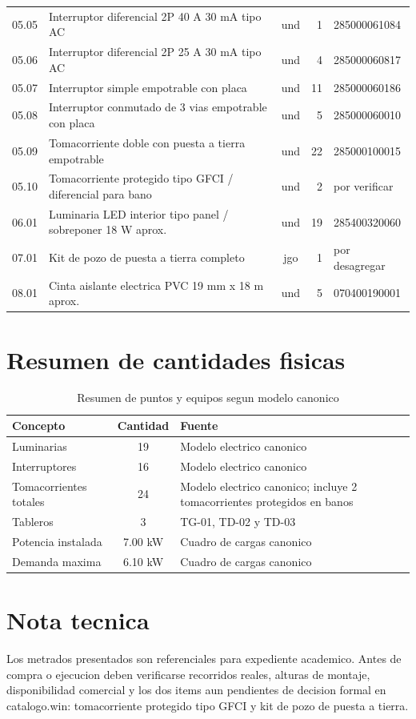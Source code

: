 \begin{landscape}
\begin{longtable}{c L{6.8cm} c r L{3.0cm}}
05.05 & Interruptor diferencial 2P 40 A 30 mA tipo AC & und & 1 & 285000061084 \\
05.06 & Interruptor diferencial 2P 25 A 30 mA tipo AC & und & 4 & 285000060817 \\
05.07 & Interruptor simple empotrable con placa & und & 11 & 285000060186 \\
05.08 & Interruptor conmutado de 3 vias empotrable con placa & und & 5 & 285000060010 \\
05.09 & Tomacorriente doble con puesta a tierra empotrable & und & 22 & 285000100015 \\
05.10 & Tomacorriente protegido tipo GFCI / diferencial para bano & und & 2 & por verificar \\
06.01 & Luminaria LED interior tipo panel / sobreponer 18 W aprox. & und & 19 & 285400320060 \\
07.01 & Kit de pozo de puesta a tierra completo & jgo & 1 & por desagregar \\
08.01 & Cinta aislante electrica PVC 19 mm x 18 m aprox. & und & 5 & 070400190001 \\
\bottomrule
\end{longtable}
\end{landscape}

\section{Resumen de cantidades fisicas}

\begin{table}[H]
\centering
\small
\caption{Resumen de puntos y equipos segun modelo canonico}
\label{tab:resumen-puntos-metrado}
\begin{tabularx}{\textwidth}{L{5.0cm} c Y}
\toprule
\textbf{Concepto} & \textbf{Cantidad} & \textbf{Fuente} \\
\midrule
Luminarias & 19 & Modelo electrico canonico \\
Interruptores & 16 & Modelo electrico canonico \\
Tomacorrientes totales & 24 & Modelo electrico canonico; incluye 2 tomacorrientes protegidos en banos \\
Tableros & 3 & TG-01, TD-02 y TD-03 \\
Potencia instalada & 7.00 kW & Cuadro de cargas canonico \\
Demanda maxima & 6.10 kW & Cuadro de cargas canonico \\
\bottomrule
\end{tabularx}
\end{table}

\section{Nota tecnica}

Los metrados presentados son referenciales para expediente academico. Antes de compra o ejecucion deben verificarse recorridos reales, alturas de montaje, disponibilidad comercial y los dos items aun pendientes de decision formal en catalogo.win: tomacorriente protegido tipo GFCI y kit de pozo de puesta a tierra.
